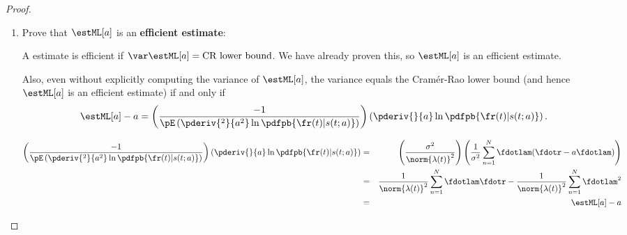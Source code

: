 \begin{proof}
\begin{enumerate}
\item Prove that $\estML[a]$ is an {\bf efficient estimate}:

A estimate is efficient if 
$\var\estML[a]=\mbox{CR lower bound}$.
We have already proven this, so $\estML[a]$ is an efficient estimate.

Also, even without explicitly computing the variance of $\estML[a]$,
the variance equals the Cram\'er-Rao lower bound 
(and hence $\estML[a]$ is an efficient estimate)
if and only if
\[ \estML[a] -  a = 
   \left( \frac{-1}{\pE\left(
              \pderiv{^2}{ a^2} \ln \pdfpb{\fr(t)|s(t; a)}
           \right)} \right)
   \left(\pderiv{}{ a} \ln \pdfpb{\fr(t)|s(t; a)} \right).
\]

\begin{eqnarray*}
   \left( \frac{-1}{\pE\left(
              \pderiv{^2}{ a^2} \ln \pdfpb{\fr(t)|s(t; a)}
           \right)} \right)
   \left(\pderiv{}{ a} \ln \pdfpb{\fr(t)|s(t; a)} \right)
     &=& \left(\frac{\sigma^2}{\norm{\lambda(t)}^2}\right)
         \left(
           \frac{1}{\sigma^2} \sum_{n=1}^N \fdotlam( \fdotr - a \fdotlam)
         \right)
   \\&=& \frac{1}{\norm{\lambda(t)}^2} \sum_{n=1}^N \fdotlam \fdotr -
         \frac{1}{\norm{\lambda(t)}^2} \sum_{n=1}^N \fdotlam^2
   \\&=& \estML[a] - a
\end{eqnarray*}


\end{enumerate}
\end{proof}


